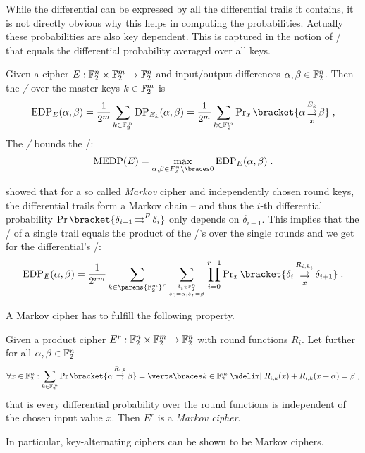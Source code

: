 While the differential can be expressed by all the differential trails it contains, it is not directly obvious why this helps in computing the probabilities.
Actually these probabilities are also key dependent.
This is captured in the notion of \EDPl/ that equals the differential probability averaged over all keys.
\begin{definition}
    Given a cipher $E : \mathbb{F}_2^n \times \mathbb{F}_2^m \to \mathbb{F}_2^n$ and input/output differences $\alpha, \beta \in \mathbb{F}_2^n$.
    Then the \emph{\EDP/} over the master keys $k \in \mathbb{F}_2^m$ is
    \begin{equation}
        \label{eqn:edp}
        \mathrm{EDP}_E(\alpha, \beta)
        = \frac{1}{2^m} \sum_{k \in \F_2^m} \mathrm{DP}_{E_k}(\alpha, \beta)
        = \frac{1}{2^m} \sum_{k \in \F_2^m} \Prob_x\bracket{\propDiff{\alpha}{E_k}{x}{\beta}}\;,
    \end{equation}
    The \emph{\MEDP/} bounds the \EDP/:
    \begin{equation*}
        \mathrm{MEDP}(E) = \max_{\alpha, \beta \in F_2^n \setminus \set{0}} \mathrm{EDP}_E(\alpha, \beta)\;.
    \end{equation*}
\end{definition}

\textcite[Section~3]{EC:LaiMasMur91} showed that for a so called \emph{Markov} cipher and independently chosen round keys, the differential trails form a Markov chain -- and thus the $i$-th differential probability $\Prob\bracket{\propDiff{\delta_{i-1}}{F}{}{\delta_{i}}}$ only depends on $\delta_{i-1}$.
This implies that the \EDP/ of a single trail equals the product of the \EDP/'s over the single rounds and we get for the differential's \EDP/:
\begin{equation}\label{eqn:differential}
    \mathrm{EDP}_E(\alpha, \beta)
    = \frac{1}{2^{rm}}
      \sum_{k \in \parens{\F_2^m}^r}
      \sum_{\tower{\delta_i \in \F_2^n}{\delta_0 = \alpha, \delta_r = \beta}}
      \prod_{i=0}^{r-1}
      \Prob_x\bracket{\propDiff{\delta_i}{R_{i,k_i}}{x}{\delta_{i+1}}}\;.
\end{equation}

A Markov cipher has to fulfill the following property.
\begin{definition}
    Given a product cipher $E^r : \mathbb{F}_2^n \times \mathbb{F}_2^m \to \mathbb{F}_2^n$ with round functions $R_i$.
    Let further for all $\alpha, \beta \in \mathbb{F}_2^n$
    \begin{equation*}
        \forall x \in \F_2^n : \sum_{k \in \F_2^m} \Prob\bracket{\propDiff{\alpha}{R_{i,k}}{}{\beta}} = \abs{\set{k \in \F_2^m \given R_{i,k}(x) + R_{i,k}(x+\alpha) = \beta}}\;,
    \end{equation*}
    that is every differential probability over the round functions is independent of the chosen input value $x$.
    Then $E^r$ is a \emph{Markov cipher}.
\end{definition}
In particular, key-alternating ciphers can be shown to be Markov ciphers.

